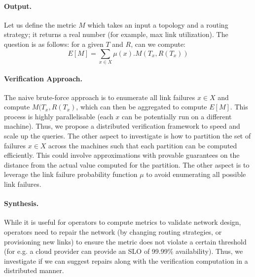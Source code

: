 \documentclass[]{article}
\begin{document}
\paragraph{Output.} Let us define the
metric $M$ which takes an input a topology and a routing 
strategy; it returns a 
real number (for example, max link utilization). 
The question is as follows: for a given $T$ and $R$,
can we compute: 
\[
	E[M] = \sum_{x \in X} \mu(x). M(T_x, R(T_x))
\]

\paragraph{Verification Approach.} The naive brute-force 
approach is to enumerate all link failures $x \in X$
and compute $M(T_x, R(T_x)$, which can then be aggregated to 
compute $E[M]$. This process is highly parallelisable (each 
$x$ can be potentially run on a different machine). Thus, we
propose a distributed verification framework to speed and 
scale up the queries. The other aspect to investigate is 
how to partition the set of failures $x \in X$ across
 the machines such that each partition can be computed
 efficiently. This could involve approximations with 
 provable guarantees on the distance from the actual 
 value computed for the partition. The other aspect 
 is to leverage the link failure probability function
 $\mu$ to avoid enumerating all possible link failures. 

\paragraph{Synthesis.} While it is useful for operators
to compute metrics to validate network design, operators need
to repair the network (by changing routing strategies, or 
provisioning new links) to ensure the metric does not violate
a certain threshold (for e.g. a cloud provider can provide 
an SLO of 99.99\% availability). Thus, we investigate 
if we can suggest repairs along with the verification computation
in a distributed manner. 
 
 
\begin{small}
	
\end{small}
\end{document}
